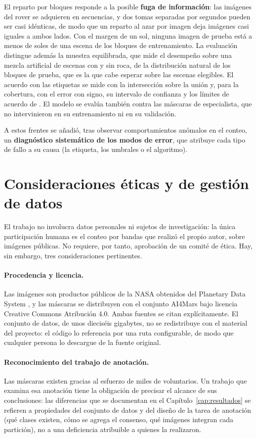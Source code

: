 El reparto por bloques responde a la posible \textbf{fuga de información}: las imágenes del rover
se adquieren en secuencias, y dos tomas separadas por segundos pueden ser casi idénticas, de modo
que un reparto al azar por imagen deja imágenes casi iguales a ambos lados. Con el margen de un
sol, ninguna imagen de prueba está a menos de \cSegDistMin{} soles de una escena de los bloques
de entrenamiento. La
evaluación distingue además la muestra equilibrada, que mide el desempeño sobre una mezcla
artificial de escenas con y sin roca, de la distribución natural de los bloques de prueba, que
es la que cabe esperar sobre las escenas elegibles. El acuerdo con las etiquetas se mide con la intersección
sobre la unión y, para la cobertura, con el error con signo, su intervalo de confianza y los
límites de acuerdo de \citet{bland1986}. El modelo se evalúa también contra las máscaras de
especialista, que no intervinieron en su entrenamiento ni en su validación.

A estos frentes se añadió, tras observar comportamientos anómalos en el conteo, un
\textbf{diagnóstico sistemático de los modos de error}, que atribuye cada tipo de fallo a su
causa (la etiqueta, los umbrales o el algoritmo).

\section{Consideraciones éticas y de gestión de datos}

El trabajo no involucra datos personales ni sujetos de investigación: la única participación
humana es el conteo por bandas que realizó el propio autor, sobre imágenes públicas. No requiere,
por tanto, aprobación de un comité de ética. Hay, sin embargo, tres consideraciones pertinentes.

\paragraph{Procedencia y licencia.} Las imágenes son productos públicos de la NASA
obtenidos del Planetary Data System \citep{nasapds2024}, y las máscaras se distribuyen
con el conjunto AI4Mars \citep{swan2022ai4marsdata} bajo licencia Creative Commons
Atribución 4.0. Ambas fuentes
se citan explícitamente. El conjunto de datos, de unos dieciséis gigabytes, no se
redistribuye con el material del proyecto: el código lo referencia por una ruta
configurable, de modo que cualquier persona lo descargue de la fuente original.

\paragraph{Reconocimiento del trabajo de anotación.} Las máscaras existen gracias al
esfuerzo de miles de voluntarios. Un trabajo que examina esa anotación tiene la obligación de
precisar el alcance de sus conclusiones: las diferencias que se documentan en el
Capítulo~\ref{cap:resultados} se refieren a propiedades del conjunto de datos y del diseño de
la tarea de anotación (qué clases existen, cómo se agrega el consenso, qué imágenes integran
cada partición), no a una deficiencia atribuible a quienes la realizaron.

